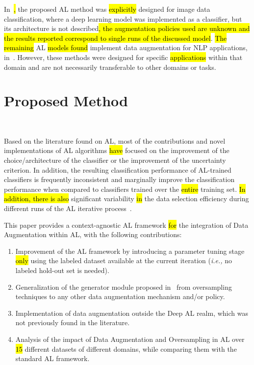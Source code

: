 \documentclass[preprint, 12pt]{elsarticle}
\begin{document}
In~\cite{Ma2020}\hl{,} the proposed AL method was \hl{explicitly} designed for image
data classification, where a deep learning model was implemented as a
classifier, but its architecture is not described\hl{, the augmentation
policies used are unknown and the results reported correspond to single runs
of the discussed model}. \hl{The remaining} AL \hl{models found} implement
data augmentation for NLP applications,
in~\cite{Quteineh2020, Li2021framework}. However, these methods were designed
for specific \hl{applications} within that domain and are not necessarily
transferable to other domains or tasks.

\section{Proposed Method}~\label{sec:proposed_method}

Based on the literature found on AL, most of the contributions and novel
implementations of AL algorithms \hl{have} focused on the improvement of the
choice/architecture of the classifier or the improvement of the uncertainty
criterion. In addition, the resulting classification performance of AL-trained
classifiers is frequently inconsistent and marginally improve the
classification performance when compared to classifiers trained over the
\hl{entire} training set. \hl{In addition, there is also} significant
variability \hl{in} the data selection efficiency during different runs of the AL
iterative process~\cite{Fonseca2021}.  


 
This paper provides a context-agnostic AL framework \hl{for} the integration
of Data Augmentation within AL, with the following contributions:

\begin{enumerate}
    \item Improvement of the AL framework by introducing a parameter tuning
        stage \hl{only} using the labeled dataset available at the current
        iteration (\textit{i.e.,} no labeled hold-out set is needed).
    \item Generalization of the generator module proposed
        in~\cite{Fonseca2021} from oversampling techniques to any other data
        augmentation mechanism and/or policy.
    \item Implementation of data augmentation outside the Deep AL realm,
        which was not previously found in the literature.
    \item Analysis of the impact of Data Augmentation and Oversampling in AL
        over \hl{15} different datasets of different domains, while comparing them
        with the standard AL framework.
\end{enumerate}
\end{document}
